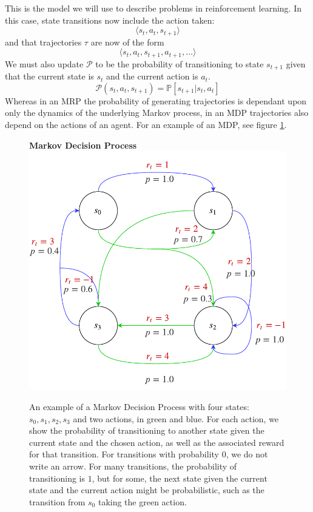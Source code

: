 \documentclass[journal, onecolumn, 12pt, draftclsnofoot]{IEEEtran}
\newcommand{\mc}[1]{\mathcal{#1}}
\begin{document}
		\par This is the model we will use to describe problems in reinforcement learning. In this case, state transitions now include the action taken:
		$$\langle s_t, a_t, s_{t+1} \rangle$$
		and that trajectories $\tau$ are now of the form
		$$\langle s_t, a_t, s_{t+1}, a_{t+1}, \dots \rangle$$
		We must also update $\mc{P}$ to be the probability of transitioning to state $s_{t+1}$ given that the current state is $s_t$ and the current action is $a_t$.
		\begin{equation}
			\label{eqn:state_transition_probability_MDP}
			\mc{P}(s_t,a_t,s_{t+1}) = \mathbb{P}\left[s_{t+1} \big\vert s_t, a_t \right]
		\end{equation}
		Whereas in an MRP the probability of generating trajectories is dependant upon only the dynamics of the underlying Markov process, in an MDP trajectories also depend on the actions of an agent. For an example of an MDP, see figure \ref{fig:mdp}.
		\begin{figure}
			\begin{center}
			\textbf{Markov Decision Process} \\
			\includegraphics{fig/mdp.pdf}
			\end{center}
			\caption{An example of a Markov Decision Process with four states: $s_0, s_1, s_2, s_3$ and two actions, in green and blue. For each action, we show the probability of transitioning to another state given the current state and the chosen action, as well as the associated reward for that transition. For transitions with probability $0$, we do not write an arrow. For many transitions, the probability of transitioning is $1$, but for some, the next state given the current state and the current action might be probabilistic, such as the transition from $s_0$ taking the green action.}
			\label{fig:mdp}
		\end{figure}
\end{document}
